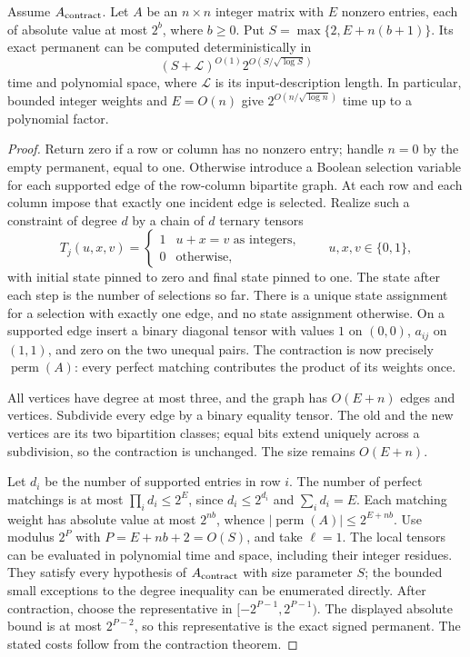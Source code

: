 \begin{proposition}
Assume \(A_{\rm contract}\).  Let \(A\) be an \(n\times n\) integer
matrix with \(E\) nonzero entries, each of absolute value at most \(2^b\),
where \(b\ge0\).  Put \(S=\max\{2,E+n(b+1)\}\).  Its exact permanent
can be computed deterministically in
\[
 (S+\mathcal L)^{O(1)}2^{O(S/\sqrt{\log S})}
\]
time and polynomial space, where \(\mathcal L\) is its input-description
length.  In particular, bounded integer weights and \(E=O(n)\) give
\(2^{O(n/\sqrt{\log n})}\) time up to a polynomial factor.
\end{proposition}
\begin{proof}
Return zero if a row or column has no nonzero entry; handle \(n=0\)
by the empty permanent, equal to one.  Otherwise introduce a Boolean
selection variable for each supported edge of the row-column bipartite
graph.  At each row and each column impose that exactly one incident
edge is selected.  Realize such a constraint of degree \(d\) by a chain
of \(d\) ternary tensors
\[
 T_j(u,x,v)=\begin{cases}1&u+x=v\text{ as integers},\\0&\text{otherwise},\end{cases}
 \qquad u,x,v\in\{0,1\},
\]
with initial state pinned to zero and final state pinned to one.
The state after each step is the number of selections so far.  There
is a unique state assignment for a selection with exactly one edge,
and no state assignment otherwise.  On a supported edge insert a
binary diagonal tensor with values \(1\) on \((0,0)\), \(a_{ij}\)
on \((1,1)\), and zero on the two unequal pairs.
The contraction is now precisely \(\operatorname{perm}(A)\): every
perfect matching contributes the product of its weights once.

All vertices have degree at most three, and the graph has \(O(E+n)\)
edges and vertices.  Subdivide every edge by a binary equality tensor.
The old and the new vertices are its two bipartition classes; equal
bits extend uniquely across a subdivision, so the contraction is
unchanged.  The size remains \(O(E+n)\).

Let \(d_i\) be the number of supported entries in row \(i\).  The
number of perfect matchings is at most \(\prod_i d_i\le2^E\), since
\(d_i\le2^{d_i}\) and \(\sum_i d_i=E\).  Each matching weight has
absolute value at most \(2^{nb}\), whence
\(|\operatorname{perm}(A)|\le2^{E+nb}\).
Use modulus \(2^P\) with \(P=E+nb+2=O(S)\), and take \(\ell=1\).
The local tensors can be evaluated in polynomial time and space,
including their integer residues.  They satisfy every hypothesis of
\(A_{\rm contract}\) with size parameter \(S\); the bounded small
exceptions to the degree inequality can be enumerated directly.
After contraction, choose the representative in
\([-2^{P-1},2^{P-1})\).  The displayed absolute bound is at most
\(2^{P-2}\), so this representative is the exact signed permanent.
The stated costs follow from the contraction theorem.
\end{proof}

